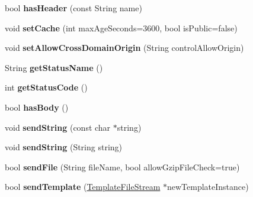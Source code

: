 \begin{DoxyCompactItemize}
\item 
\hypertarget{class_http_response_af7ca427335e5e6c6472ae031a8787d70}{}bool {\bfseries has\+Header} (const String name)\label{class_http_response_af7ca427335e5e6c6472ae031a8787d70}

\item 
\hypertarget{class_http_response_a097289521073c2f83c0c3edbee0eec23}{}void {\bfseries set\+Cache} (int max\+Age\+Seconds=3600, bool is\+Public=false)\label{class_http_response_a097289521073c2f83c0c3edbee0eec23}

\item 
\hypertarget{class_http_response_acd6c13889d13cf411e7e3ab34354664d}{}void {\bfseries set\+Allow\+Cross\+Domain\+Origin} (String control\+Allow\+Origin)\label{class_http_response_acd6c13889d13cf411e7e3ab34354664d}

\item 
\hypertarget{class_http_response_a376d0bd8b7fbf9facb99134583ae2ed1}{}String {\bfseries get\+Status\+Name} ()\label{class_http_response_a376d0bd8b7fbf9facb99134583ae2ed1}

\item 
\hypertarget{class_http_response_a6906d59ec9169d518e2bf9abada484ae}{}int {\bfseries get\+Status\+Code} ()\label{class_http_response_a6906d59ec9169d518e2bf9abada484ae}

\item 
\hypertarget{class_http_response_ae8045d121a30f6d7d0e21aa6cc412b97}{}bool {\bfseries has\+Body} ()\label{class_http_response_ae8045d121a30f6d7d0e21aa6cc412b97}

\item 
\hypertarget{class_http_response_aafed32c182626bb9f384105b2741d6b1}{}void {\bfseries send\+String} (const char $\ast$string)\label{class_http_response_aafed32c182626bb9f384105b2741d6b1}

\item 
\hypertarget{class_http_response_afb7fa4e217cfa24ee5afa00b63da761e}{}void {\bfseries send\+String} (String string)\label{class_http_response_afb7fa4e217cfa24ee5afa00b63da761e}

\item 
\hypertarget{class_http_response_a5ac8fc1d595d26d0e43b7429ac640743}{}bool {\bfseries send\+File} (String file\+Name, bool allow\+Gzip\+File\+Check=true)\label{class_http_response_a5ac8fc1d595d26d0e43b7429ac640743}

\item 
\hypertarget{class_http_response_a8e389f1caa47c5d77a9d0dd14ea15905}{}bool {\bfseries send\+Template} (\hyperlink{class_template_file_stream}{Template\+File\+Stream} $\ast$new\+Template\+Instance)\label{class_http_response_a8e389f1caa47c5d77a9d0dd14ea15905}


\end{DoxyCompactItemize}
